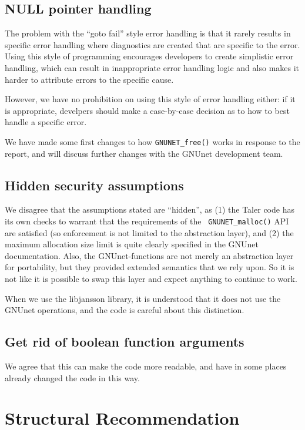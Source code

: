 \documentclass[11pt]{article}
\begin{document}
\subsection{NULL pointer handling}

The problem with the ``goto fail'' style error handling is that it rarely
results in specific error handling where diagnostics are created that are
specific to the error. Using this style of programming encourages developers
to create simplistic error handling, which can result in inappropriate error
handling logic and also makes it harder to attribute errors to the specific
cause.

However, we have no prohibition on using this style of error handling either:
if it is appropriate, develpers should make a case-by-case decision as to how
to best handle a specific error.

We have made some first changes to how {\tt GNUNET\_free()} works in response
to the report, and will discuss further changes with the GNUnet development
team.

\subsection{Hidden security assumptions}

We disagree that the assumptions stated are ``hidden'', as (1) the Taler code
has its own checks to warrant that the requirements of the {\tt
  GNUNET\_malloc()} API are satisfied (so enforcement is not limited to the
abstraction layer), and (2) the maximum allocation size limit is quite clearly
specified in the GNUnet documentation.  Also, the GNUnet-functions are not
merely an abstraction layer for portability, but they provided extended
semantics that we rely upon. So it is not like it is possible to swap this
layer and expect anything to continue to work.

When we use the libjansson library, it is understood that it does not use
the GNUnet operations, and the code is careful about this distinction.

\subsection{Get rid of boolean function arguments}

We agree that this can make the code more readable, and have in some places
already changed the code in this way.

\section{Structural Recommendation}
\end{document}
